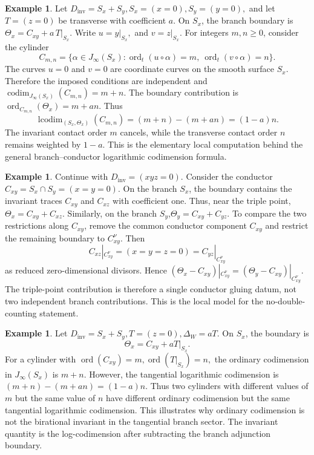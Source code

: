 \documentclass[11pt]{amsart}
\numberwithin{equation}{section}
\theoremstyle{plain}
\theoremstyle{definition}
\newtheorem{Example}[Theorem]{Example}
\newcommand{\codim}{\operatorname{codim}}
\newcommand{\ord}{\operatorname{ord}}
\newcommand{\lcodim}{\operatorname{lcodim}}
\newcommand{\Dinv}{D_{\mathrm{inv}}}
\begin{document}
\begin{Example}
Let
$
\Dinv=S_x+S_y,
S_x=(x=0),
S_y=(y=0),
$
and let $T=(z=0)$ be transverse with coefficient $a$. On $S_x$, the branch
boundary is
$
\Theta_x=C_{xy}+a\,T|_{S_x}.
$
Write
 $
u=y|_{S_x},$ and $
v=z|_{S_x}.
$
For integers $m,n\geq 0$, consider the cylinder
\[
C_{m,n}
=
\{\alpha\in J_\infty(S_x):\ord_t(u\circ\alpha)=m,\
\ord_t(v\circ\alpha)=n\}.
\]
The curves $u=0$ and $v=0$ are coordinate curves on the smooth surface
$S_x$. Therefore the imposed conditions are independent and
$
\codim_{J_\infty(S_x)}(C_{m,n})=m+n.
$
The boundary contribution is
$
\ord_{C_{m,n}}(\Theta_x)=m+an.
$
Thus
\[
\lcodim_{(S_x,\Theta_x)}(C_{m,n})
=
(m+n)-(m+an)
=
(1-a)n.
\]
The invariant contact order $m$ cancels, while the transverse contact order
$n$ remains weighted by $1-a$. This is the elementary local computation
behind the general branch--conductor logarithmic codimension formula.
\end{Example}


\begin{Example}
Continue with
$
\Dinv=(xyz=0).$
Consider the conductor
$
C_{xy}=S_x\cap S_y=(x=y=0).
$
On the branch $S_x$, the boundary contains the invariant traces $
C_{xy}
 $ and $
C_{xz}
$
with coefficient one. Thus, near the triple point,
$
\Theta_x=C_{xy}+C_{xz}.
$
Similarly, on the branch $S_y$,$
\Theta_y=C_{xy}+C_{yz}.
$
To compare the two restrictions along $C_{xy}$, remove the common conductor
component $C_{xy}$ and restrict the remaining boundary to
$C_{xy}^{\nu}$. Then
\[
C_{xz}|_{C_{xy}^{\nu}}=(x=y=z=0)
=
C_{yz}|_{C_{xy}^{\nu}}
\]
as reduced zero-dimensional divisors. Hence
$
(\Theta_x-C_{xy})|_{C_{xy}^{\nu}}
=
(\Theta_y-C_{xy})|_{C_{xy}^{\nu}}.
$
The triple-point contribution is therefore a single conductor gluing datum,
not two independent branch contributions. This is the local model for the
no-double-counting statement.
\end{Example}



\begin{Example}
Let
$
\Dinv=S_x+S_y,
T=(z=0),
\Delta_W=aT.
$
On $S_x$, the boundary is
\[
\Theta_x=C_{xy}+aT|_{S_x}.
\]
For a cylinder with
$
\ord(C_{xy})=m,
\ord(T|_{S_x})=n,
$
the ordinary codimension in $J_\infty(S_x)$ is
$
m+n.
$ However, the tangential logarithmic codimension is
$
(m+n)-(m+an)=(1-a)n.
$
Thus two cylinders with different values of $m$ but the same value of $n$
have different ordinary codimension but the same tangential logarithmic codimension.
This illustrates why ordinary codimension is not the birational invariant in
the tangential branch sector. The invariant quantity is the log-codimension
after subtracting the branch adjunction boundary.
\end{Example}
\end{document}
